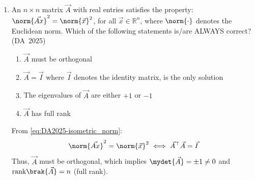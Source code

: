 \begin{enumerate}[label=\thesubsection.\arabic*, ref=\thesubsection.\theenumi]
\begin{itemize}
	\item Uniqueness of critical points: Suppose there exist distinct points $x, y \in \mathbb{R}$ with $x < y$ such that $f'(x) = f'(y) = 0$. Applying Rolle's Theorem \eqref{eq:DA2025-rolles} to the function $g(t) = f'(t)$ on $[x, y]$:
	\begin{align}
		g(x) = g(y) = 0 \implies \exists \, c \in (x, y) \text{ s.t. } g'(c) = f''(c) = 0
	\end{align}
	This contradicts the given condition that $f''(t) > 0$ for all $t \in \mathbb{R}$. Hence, no such pair of points can exist, meaning $f'(x) = 0$ can occur at at most one point.
	
	\item Global and local minima count: For any convex function, any local minimum is necessarily a global minimum. Since $f'(x)$ is strictly increasing, $f'(x) = 0$ has at most one solution, ensuring $f$ has at most one local minimum and at most one global minimum.
\end{itemize}
\item 
An $n \times n$ matrix $\vec{A}$ with real entries satisfies the property: $\norm{\vec{Ax}}^2 = \norm{\vec{x}}^2$, for all $\vec{x} \in \mathbb{R}^n$, where $\norm{\cdot}$ denotes the Euclidean norm. Which of the following statements is/are ALWAYS correct?
\hfill (DA~2025)
\begin{enumerate}
	\item $\vec{A}$ must be orthogonal
	\item $\vec{A} = \vec{I}$ where $\vec{I}$ denotes the identity matrix, is the only solution
	\item The eigenvalues of $\vec{A}$ are either $+1$ or $-1$
	\item $\vec{A}$ has full rank
\end{enumerate}
\solution
From \eqref{eq:DA2025-isometric_norm}:
\begin{align}
	\norm{\vec{Ax}}^2 = \norm{\vec{x}}^2 \iff \vec{A}^\top\vec{A} = \vec{I}
\end{align}
Thus, $\vec{A}$ must be orthogonal, which implies $\mydet{\vec{A}} = \pm 1 \neq 0$ and $\text{rank}\brak{\vec{A}} = n$ (full rank).


\end{enumerate}
